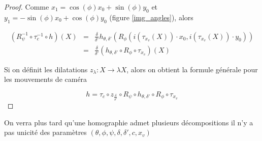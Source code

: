 \begin{proof}
Comme $x_{1}=\cos(\phi)x_{0}+\sin(\phi)y_{0}$ et $y_{1}=-\sin(\phi)x_{0}+\cos(\phi)y_{0}$ (figure \ref{img_angles}), alors

\begin{eqnarray*}
(R_{\psi}^{-1} \circ \tau_{c}^{-1} \circ h)(X) &=& \frac{\delta}{\delta'}h_{\theta,\delta'}\left ( R_{\phi}(i(\tau_{x_{v}}(X)) \cdot x_{0}, i(\tau_{x_{v}}(X)) \cdot y_{0})\right)\\
                                               &=&\frac{\delta}{\delta'} (h_{\theta,\delta'}\circ R_{\phi} \circ \tau_{x_{v}})(X)
\end{eqnarray*}

Si on définit les dilatations $z_{\lambda}:X\rightarrow \lambda X$, alors on obtient la formule générale pour les mouvements de caméra

\begin{equation*}
h = \tau_{c} \circ z_{\frac{\delta}{\delta'}}  \circ R_{\psi} \circ h_{\theta,\delta'} \circ R_{\phi} \circ \tau_{x_{v}}
\end{equation*}

\end{proof}
On verra plus tard qu'une homographie admet plusieurs décompositions il n'y a pas unicité des paramètres $(\theta,\phi,\psi,\delta,\delta',c,x_v)$
